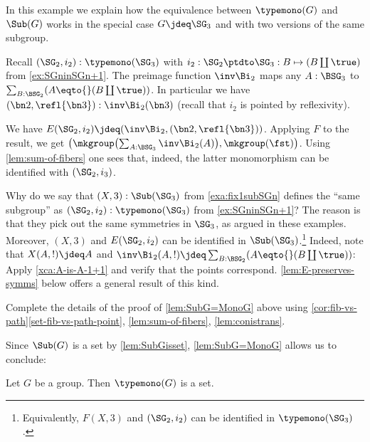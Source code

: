  \begin{example}\label{exa:EforSG3}
  In this example we explain how the equivalence between
  $\typemono(G)$ and $\Sub(G)$ works in the special case
  $G\jdeq\SG_3$ and with two versions of the same subgroup.
  
  Recall $(\SG_2,i_2):\typemono(\SG_3)$ with
  $i_2: \SG_2\ptdto\SG_3 : B\mapsto (B\coprod\true)$ from \cref{ex:SGninSGn+1}.
  The preimage function $\inv\Bi_2$ maps any $A:\BSG_3$
  to $\sum_{B:\BSG_2}(A\eqto{}(B\coprod\true))$.
  In particular we have $(\bn2,\refl{\bn3}):\inv\Bi_2(\bn3)$
  (recall that $i_2$ is pointed by reflexivity).
   
  We have $E(\SG_2,i_2)\jdeq(\inv\Bi_2,(\bn2,\refl{\bn3}))$. Applying $F$ to
  the result, we get
  $\bigl(\mkgroup\bigl(\sum_{A:\BSG_3}\inv\Bi_2(A)\bigr),\mkgroup(\fst)\bigr)$. Using
  \cref{lem:sum-of-fibers} one sees that, indeed, the latter monomorphism can be
  identified with $(\SG_2,i_3)$.
  
  Why do we say that $(X,3):\Sub(\SG_3)$ from \cref{exa:fix1subSGn} defines the
  ``same subgroup'' as $(\SG_2,i_2):\typemono(\SG_3)$ from \cref{ex:SGninSGn+1}?
  The reason is that they pick out the same symmetries in $\SG_3$, as argued in
  these examples.  Moreover, $(X,3)$ and $E(\SG_2,i_2)$ can be identified in
  $\Sub(\SG_3)$.\footnote{Equivalently, $F(X,3)$ and $(\SG_2,i_2)$ can be
    identified in $\typemono(\SG_3)$.}  Indeed, note that $X(A,!) \jdeq A$ and
  $\inv\Bi_2(A,!) \jdeq \sum_{B:\BSG_2}(A\eqto{}(B\coprod\true))$: Apply
  \cref{xca:A-is-A-1+1} and verify that the points correspond.
  \cref{lem:E-preserves-symms} below offers a general result of this kind.
  \end{example}

\begin{xca}\label{xca:SubG=MonoG}
Complete the details of the proof of \cref{lem:SubG=MonoG} above using 
\cref{cor:fib-vs-path}\ref{set-fib-vs-path-point},
\cref{lem:sum-of-fibers},
\cref{lem:conistrans}.
\end{xca}

Since $\Sub(G)$ is a set by \cref{lem:SubGisset}, 
\cref{lem:SubG=MonoG} allows us to conclude:

\begin{corollary}\label{lem:setofsubgroups}
Let $G$ be a group. Then $\typemono(G)$ is a set.
\end{corollary}

